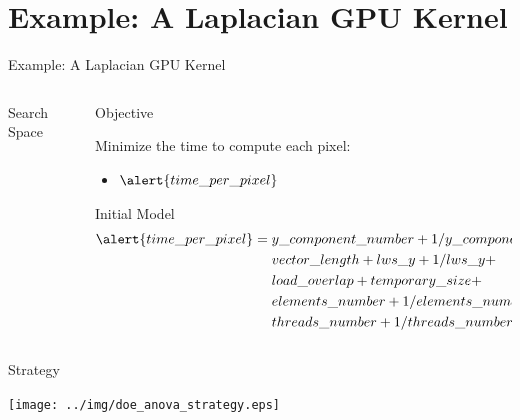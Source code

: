 \documentclass[10pt, compress, aspectratio=169, xcolor={table,usenames,dvipsnames}]{beamer}
\begin{document}
\section{Example: A Laplacian GPU Kernel}
\label{sec:org86e4d1b}
\begin{frame}[label={sec:org97cc2ab}]{Example: A Laplacian GPU Kernel}
\begin{columns}
\begin{column}{0.5\columnwidth}
\begin{block}{Search Space}
\vspace{-.2cm}


\end{block}
\end{column}
\begin{column}{0.5\columnwidth}
\begin{block}{Objective}
\vspace{.2cm}

\alert{Minimize} the \alert{time to compute each pixel}:
\begin{itemize}
\item \(\alert{time\_per\_pixel}\)
\end{itemize}

\begin{block}{Initial Model}
\scriptsize
\begin{align*}
      \alert{time\_per\_pixel} = & \; y\_component\_number + 1 / y\_component\_number + \\
                        & \; vector\_length + lws\_y + 1 / lws\_y + \\
                        & \; load\_overlap + temporary\_size + \\
                        & \; elements\_number + 1 / elements\_number + \\
                        & \; threads\_number + 1 / threads\_number
\end{align*}
\normalsize
\end{block}
\end{block}
\end{column}
\end{columns}
\end{frame}
\begin{frame}[label={sec:org149b617}]{Strategy}
\begin{center}
\texttt{[image: ../img/doe\_anova\_strategy.eps]}
\end{center}
\end{frame}
\end{document}
